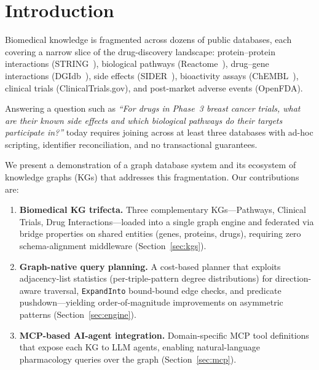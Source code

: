 \documentclass[sigconf]{acmart}
\begin{document}
\section{Introduction}\label{sec:intro}

Biomedical knowledge is fragmented across dozens of public databases,
each covering a narrow slice of the drug-discovery landscape:
protein--protein interactions (STRING~\cite{szklarczyk2023string}),
biological pathways (Reactome~\cite{gillespie2022reactome}), drug--gene
interactions (DGIdb~\cite{freshour2021dgidb}), side effects
(SIDER~\cite{kuhn2016sider}), bioactivity assays
(ChEMBL~\cite{zdrazil2024chembl}), clinical trials
(ClinicalTrials.gov), and post-market adverse events (OpenFDA).

Answering a question such as \emph{``For drugs in Phase~3 breast cancer
trials, what are their known side effects and which biological pathways
do their targets participate in?''} today requires joining across at
least three databases with ad-hoc scripting, identifier reconciliation,
and no transactional guarantees.

We present a demonstration of a graph database system and its ecosystem
of knowledge graphs (KGs) that addresses this fragmentation.  Our
contributions are:

\begin{enumerate}
\item \textbf{Biomedical KG trifecta.}  Three complementary KGs---Pathways,
Clinical Trials, Drug Interactions---loaded into a single graph
engine and federated via bridge properties on shared entities
(genes, proteins, drugs), requiring zero schema-alignment middleware
(Section~\ref{sec:kgs}).

\item \textbf{Graph-native query planning.}  A cost-based planner that
exploits adjacency-list statistics (per-triple-pattern degree
distributions) for direction-aware traversal, \texttt{ExpandInto}
bound-bound edge checks, and predicate pushdown---yielding
order-of-magnitude improvements on asymmetric patterns
(Section~\ref{sec:engine}).

\item \textbf{MCP-based AI-agent integration.}  Domain-specific MCP
tool definitions that expose each KG to LLM agents, enabling
natural-language pharmacology queries over the graph
(Section~\ref{sec:mcp}).
\end{enumerate}

\end{document}
